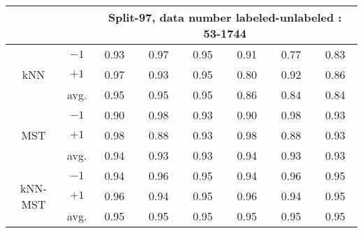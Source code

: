 \begin{table}[t!]
{\begin{tabular}{ c|c|ccc|ccc }
			\multicolumn{2}{c}{} & \multicolumn{6}{c}{Split-97,  data number labeled-unlabeled : 53-1744}\\
			
			\hline
			\multirow{3}{*}{kNN} 
			& $-1$ & 0.93 & 0.97 & 0.95 & 0.91 & 0.77 & 0.83 \\
			& $+1$ & 0.97 & 0.93 & 0.95 & 0.80 & 0.92 & 0.86 \\
			\cline{2-8}
			& avg. & 0.95 & 0.95 & 0.95 & 0.86 & 0.84 & 0.84 \\
			\hline
			\multirow{3}{*}{MST} 
			& $-1$ & 0.90 & 0.98 & 0.93 & 0.90 & 0.98 & 0.93 \\
			& $+1$ & 0.98 & 0.88 & 0.93 & 0.98 & 0.88 & 0.93 \\
			\cline{2-8}
			& avg. & 0.94 & 0.93 & 0.93 & 0.94 & 0.93 & 0.93 \\
			\hline
			\multirow{3}{*}{kNN-MST} 
			& $-1$ & 0.94 & 0.96 & 0.95 & 0.94 & 0.96 & 0.95 \\
			& $+1$ & 0.96 & 0.94 & 0.95 & 0.96 & 0.94 & 0.95 \\
			\cline{2-8}
			& avg. & 0.95 & 0.95 & 0.95 & 0.95 & 0.95 & 0.95 \\
			\hline
	\end{tabular}}
\end{table}